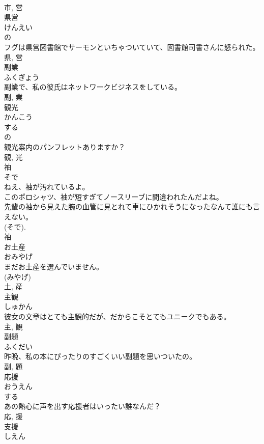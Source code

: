 \documentclass[8pt]{extreport}
\begin{document}
\begin{CJK}{UTF8}{min}
\\	市, 営	
\\	県営	
\\	けんえい	
\\	の 
\\	フグは県営図書館でサーモンといちゃついていて、図書館司書さんに怒られた。	
\\	県, 営	
\\	副業	
\\	ふくぎょう	
\\	副業で、私の彼氏はネットワークビジネスをしている。	
\\	副, 業	
\\	観光	
\\	かんこう	
\\	する 
\\	の 
\\	観光案内のパンフレットありますか？	
\\	観, 光	
\\	袖	
\\	そで	
\\	ねえ、袖が汚れているよ。	
\\	このポロシャツ、袖が短すぎてノースリーブに間違われたんだよね。	
\\	先輩の袖から見えた腕の血管に見とれて車にひかれそうになったなんて誰にも言えない。	
\\	(そで). 
\\	袖	
\\	お土産	
\\	おみやげ	
\\	まだお土産を選んでいません。	
\\	(みやげ) 
\\	土, 産	
\\	主観	
\\	しゅかん	
\\	彼女の文章はとても主観的だが、だからこそとてもユニークでもある。	
\\	主, 観	
\\	副題	
\\	ふくだい	
\\	昨晩、私の本にぴったりのすごくいい副題を思いついたの。	
\\	副, 題	
\\	応援	
\\	おうえん	
\\	する 
\\	あの熱心に声を出す応援者はいったい誰なんだ？	
\\	応, 援	
\\	支援	
\\	しえん	

\end{CJK}
\end{document}
